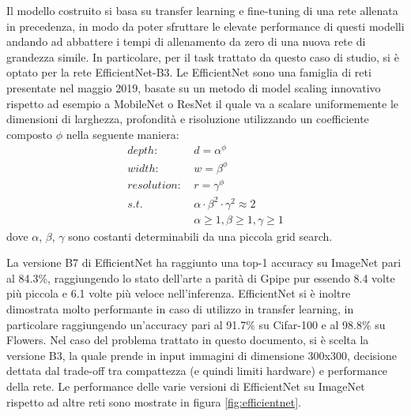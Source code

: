         Il modello costruito si basa su transfer learning e fine-tuning di una rete allenata in precedenza, in modo da poter sfruttare le elevate performance di questi modelli andando
        ad abbattere i tempi di allenamento da zero di una nuova rete di grandezza simile. In particolare, per il task trattato da questo caso di studio, si è optato per la rete 
        EfficientNet-B3. Le EfficientNet sono una famiglia di reti presentate nel maggio 2019, basate su un metodo di model scaling innovativo rispetto ad esempio a MobileNet o ResNet
        il quale va a scalare uniformemente le dimensioni di larghezza, profondità e risoluzione utilizzando un coefficiente composto $\phi$ nella seguente maniera:
        \begin{equation}
            \begin{split}
                depth:&\ d = \alpha^\phi\\
                width:&\ w = \beta^\phi\\
                resolution:&\  r = \gamma^\phi\\
                s.t.&\ \alpha \cdot \beta^2 \cdot \gamma^2 \approx 2\\
                &\ \alpha\geq1, \beta\geq1, \gamma\geq1
            \end{split}
        \end{equation}
        dove $\alpha$, $\beta$, $\gamma$ sono costanti determinabili da una piccola grid search.
        
        La versione B7 di EfficientNet ha raggiunto una top-1 accuracy su ImageNet pari al 84.3\%, raggiungendo lo stato dell'arte a parità di Gpipe pur essendo 8.4 volte più piccola e 6.1 volte più veloce nell'inferenza.
        EfficientNet si è inoltre dimostrata molto performante in caso di utilizzo in transfer learning, in particolare raggiungendo un'accuracy pari al 91.7\% su Cifar-100 e al 98.8\% 
        su Flowers. Nel caso del problema trattato in questo documento, si è scelta la versione B3, la quale prende in input immagini di dimensione 300x300, decisione dettata dal trade-off tra compattezza
        (e quindi limiti hardware) e performance della rete. 
        Le performance delle varie versioni di EfficientNet su ImageNet rispetto ad altre reti sono mostrate in figura \ref{fig:efficientnet}.


